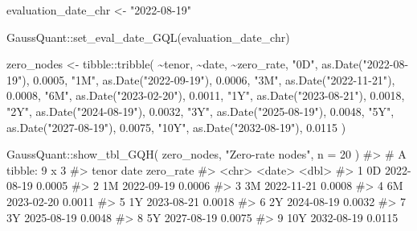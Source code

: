 \documentclass[
  letterpaper,
  DIV=11,
  numbers=noendperiod]{scrreprt}
\newenvironment{Shaded}{\begin{snugshade}}{\end{snugshade}}
\newcommand{\AttributeTok}[1]{\textcolor[rgb]{0.40,0.45,0.13}{#1}}
\newcommand{\CommentTok}[1]{\textcolor[rgb]{0.37,0.37,0.37}{#1}}
\newcommand{\DecValTok}[1]{\textcolor[rgb]{0.68,0.00,0.00}{#1}}
\newcommand{\FloatTok}[1]{\textcolor[rgb]{0.68,0.00,0.00}{#1}}
\newcommand{\FunctionTok}[1]{\textcolor[rgb]{0.28,0.35,0.67}{#1}}
\newcommand{\NormalTok}[1]{\textcolor[rgb]{0.00,0.23,0.31}{#1}}
\newcommand{\OtherTok}[1]{\textcolor[rgb]{0.00,0.23,0.31}{#1}}
\newcommand{\SpecialCharTok}[1]{\textcolor[rgb]{0.37,0.37,0.37}{#1}}
\newcommand{\StringTok}[1]{\textcolor[rgb]{0.13,0.47,0.30}{#1}}
\begin{document}
\begin{Shaded}
\begin{Highlighting}[]
\NormalTok{evaluation\_date\_chr }\OtherTok{\textless{}{-}} \StringTok{"2022{-}08{-}19"}

\NormalTok{GaussQuant}\SpecialCharTok{::}\FunctionTok{set\_eval\_date\_GQL}\NormalTok{(evaluation\_date\_chr)}

\NormalTok{zero\_nodes }\OtherTok{\textless{}{-}}\NormalTok{ tibble}\SpecialCharTok{::}\FunctionTok{tribble}\NormalTok{(}
  \SpecialCharTok{\textasciitilde{}}\NormalTok{tenor, }\SpecialCharTok{\textasciitilde{}}\NormalTok{date, }\SpecialCharTok{\textasciitilde{}}\NormalTok{zero\_rate,}
  \StringTok{"0D"}\NormalTok{,  }\FunctionTok{as.Date}\NormalTok{(}\StringTok{"2022{-}08{-}19"}\NormalTok{), }\FloatTok{0.0005}\NormalTok{,}
  \StringTok{"1M"}\NormalTok{,  }\FunctionTok{as.Date}\NormalTok{(}\StringTok{"2022{-}09{-}19"}\NormalTok{), }\FloatTok{0.0006}\NormalTok{,}
  \StringTok{"3M"}\NormalTok{,  }\FunctionTok{as.Date}\NormalTok{(}\StringTok{"2022{-}11{-}21"}\NormalTok{), }\FloatTok{0.0008}\NormalTok{,}
  \StringTok{"6M"}\NormalTok{,  }\FunctionTok{as.Date}\NormalTok{(}\StringTok{"2023{-}02{-}20"}\NormalTok{), }\FloatTok{0.0011}\NormalTok{,}
  \StringTok{"1Y"}\NormalTok{,  }\FunctionTok{as.Date}\NormalTok{(}\StringTok{"2023{-}08{-}21"}\NormalTok{), }\FloatTok{0.0018}\NormalTok{,}
  \StringTok{"2Y"}\NormalTok{,  }\FunctionTok{as.Date}\NormalTok{(}\StringTok{"2024{-}08{-}19"}\NormalTok{), }\FloatTok{0.0032}\NormalTok{,}
  \StringTok{"3Y"}\NormalTok{,  }\FunctionTok{as.Date}\NormalTok{(}\StringTok{"2025{-}08{-}19"}\NormalTok{), }\FloatTok{0.0048}\NormalTok{,}
  \StringTok{"5Y"}\NormalTok{,  }\FunctionTok{as.Date}\NormalTok{(}\StringTok{"2027{-}08{-}19"}\NormalTok{), }\FloatTok{0.0075}\NormalTok{,}
  \StringTok{"10Y"}\NormalTok{, }\FunctionTok{as.Date}\NormalTok{(}\StringTok{"2032{-}08{-}19"}\NormalTok{), }\FloatTok{0.0115}
\NormalTok{)}

\NormalTok{GaussQuant}\SpecialCharTok{::}\FunctionTok{show\_tbl\_GQH}\NormalTok{(}
\NormalTok{  zero\_nodes,}
  \StringTok{"Zero{-}rate nodes"}\NormalTok{,}
  \AttributeTok{n =} \DecValTok{20}
\NormalTok{)}
\CommentTok{\#\textgreater{} \# A tibble: 9 x 3}
\CommentTok{\#\textgreater{}   tenor date       zero\_rate}
\CommentTok{\#\textgreater{}   \textless{}chr\textgreater{} \textless{}date\textgreater{}         \textless{}dbl\textgreater{}}
\CommentTok{\#\textgreater{} 1 0D    2022{-}08{-}19    0.0005}
\CommentTok{\#\textgreater{} 2 1M    2022{-}09{-}19    0.0006}
\CommentTok{\#\textgreater{} 3 3M    2022{-}11{-}21    0.0008}
\CommentTok{\#\textgreater{} 4 6M    2023{-}02{-}20    0.0011}
\CommentTok{\#\textgreater{} 5 1Y    2023{-}08{-}21    0.0018}
\CommentTok{\#\textgreater{} 6 2Y    2024{-}08{-}19    0.0032}
\CommentTok{\#\textgreater{} 7 3Y    2025{-}08{-}19    0.0048}
\CommentTok{\#\textgreater{} 8 5Y    2027{-}08{-}19    0.0075}
\CommentTok{\#\textgreater{} 9 10Y   2032{-}08{-}19    0.0115}
\end{Highlighting}
\end{Shaded}
\end{document}
